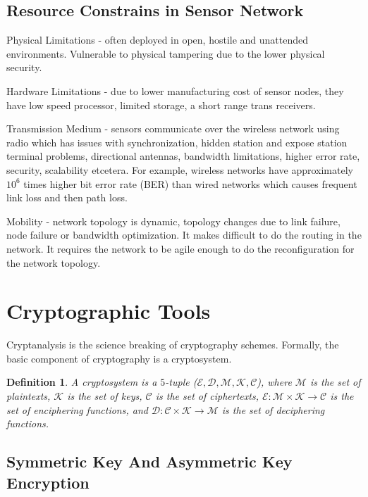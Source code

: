 \documentclass[%
  slidesonly,%
  semlayer%
  ]{xseminar}                                  %
\newtheorem{definition}{Definition}[section]
\begin{document}
\begin{slide}
      \clearpage

  \subsection*{Resource Constrains in Sensor Network}
    Physical Limitations - often deployed in open, hostile and unattended environments. Vulnerable to physical tampering due to the lower physical security.

    Hardware Limitations - due to lower manufacturing cost of sensor nodes, they have low speed processor, limited storage, a short range trans receivers.

    Transmission Medium - sensors communicate over the wireless network using radio which has issues with synchronization, hidden station and expose station terminal problems, directional antennas, bandwidth limitations, higher error rate, security, scalability etcetera.
    For example, wireless networks have approximately $10^6$ times higher bit error rate (BER) than wired networks which causes frequent link loss and then path loss.

    Mobility - network topology is dynamic, topology changes due to link failure, node failure or bandwidth optimization.
    It makes difficult to do the routing in the network.
    It requires the network to be agile enough to do the reconfiguration for the network topology. 

    \clearpage

\section*{Cryptographic Tools}
  Cryptanalysis is the science breaking of cryptography schemes.
  Formally, the basic component of cryptography is a cryptosystem.
  \begin{definition}
    A cryptosystem is a $5$-tuple ($ \mathcal{E,D,M,K,C}$), where $\mathcal{M}$ is the set of \textit{plaintexts}, $\mathcal{K}$ is the set of \textit{keys}, $\mathcal{C}$ is the set of \textit{ciphertexts}, $\mathcal{E}:\mathcal{M} \times \mathcal{K} \rightarrow \mathcal{C}$ is the set of \textit{enciphering functions}, and $\mathcal{D}:\mathcal{C} \times \mathcal{K} \rightarrow \mathcal{M}$ is the set of \textit{deciphering functions}.
  \end{definition}
  \clearpage

  \subsection*{Symmetric Key And Asymmetric Key Encryption}


\end{slide}
\end{document}
